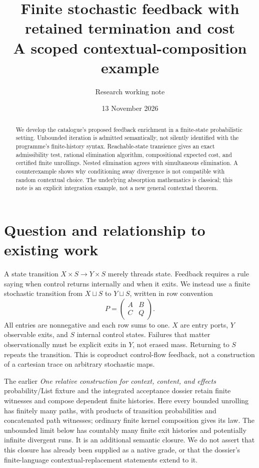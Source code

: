 \documentclass[11pt]{article}
\title{Finite stochastic feedback with retained termination and cost\\A scoped contextual-composition example}
\author{Research working note}\date{13 November 2026}
\begin{document}
\maketitle
\begin{abstract}
We develop the catalogue's proposed feedback enrichment in a finite-state probabilistic setting. Unbounded iteration is admitted semantically, not silently identified with the programme's finite-history syntax. Reachable-state transience gives an exact admissibility test, rational elimination algorithm, compositional expected cost, and certified finite unrollings. Nested elimination agrees with simultaneous elimination. A counterexample shows why conditioning away divergence is not compatible with random contextual choice. The underlying absorption mathematics is classical; this note is an explicit integration example, not a new general contextad theorem.
\end{abstract}
\section{Question and relationship to existing work}
A state transition $X\times S\to Y\times S$ merely threads state. Feedback requires a rule saying when control returns internally and when it exits. We instead use a finite stochastic transition from $X\sqcup S$ to $Y\sqcup S$, written in row convention
\[P=\begin{pmatrix}A&B\\C&Q\end{pmatrix}.
\]
All entries are nonnegative and each row sums to one. $X$ are entry ports, $Y$ observable exits, and $S$ internal control states. Failures that matter observationally must be explicit exits in $Y$, not erased mass. Returning to $S$ repeats the transition. This is coproduct control-flow feedback, not a construction of a cartesian trace on arbitrary stochastic maps.

The earlier \emph{One relative construction for context, content, and effects} probability/List fixture and the integrated acceptance dossier retain finite witnesses and compose dependent finite histories. Here every bounded unrolling has finitely many paths, with products of transition probabilities and concatenated path witnesses; ordinary finite kernel composition gives its law. The unbounded limit below has countably many finite exit histories and potentially infinite divergent runs. It is an additional semantic closure. We do not assert that this closure has already been supplied as a native grade, or that the dossier's finite-language contextual-replacement statements extend to it.
\end{document}
